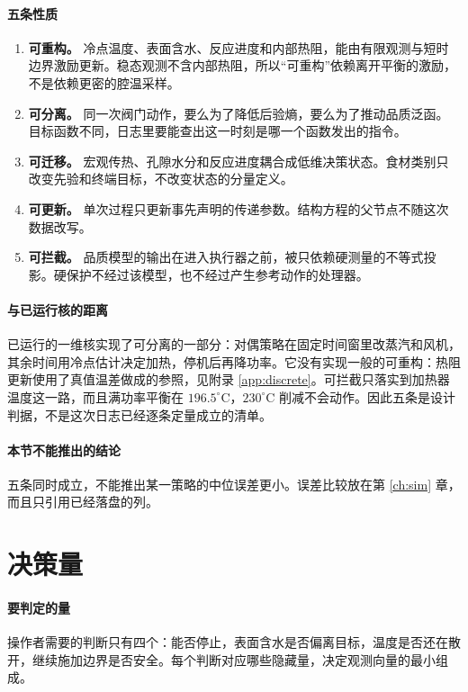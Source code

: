 \paragraph{五条性质}
\begin{enumerate}
\item \textbf{可重构。} 冷点温度、表面含水、反应进度和内部热阻，能由有限观测与短时边界激励更新。稳态观测不含内部热阻，所以“可重构”依赖离开平衡的激励，不是依赖更密的腔温采样。
\item \textbf{可分离。} 同一次阀门动作，要么为了降低后验熵，要么为了推动品质泛函。目标函数不同，日志里要能查出这一时刻是哪一个函数发出的指令。
\item \textbf{可迁移。} 宏观传热、孔隙水分和反应进度耦合成低维决策状态。食材类别只改变先验和终端目标，不改变状态的分量定义。
\item \textbf{可更新。} 单次过程只更新事先声明的传递参数。结构方程的父节点不随这次数据改写。
\item \textbf{可拦截。} 品质模型的输出在进入执行器之前，被只依赖硬测量的不等式投影。硬保护不经过该模型，也不经过产生参考动作的处理器。
\end{enumerate}

\paragraph{与已运行核的距离}
已运行的一维核实现了可分离的一部分：对偶策略在固定时间窗里改蒸汽和风机，其余时间用冷点估计决定加热，停机后再降功率。它没有实现一般的可重构：热阻更新使用了真值温差做成的参照，见附录 \ref{app:discrete}。可拦截只落实到加热器温度这一路，而且满功率平衡在 \(196.5^\circ\mathrm{C}\)，\(230^\circ\mathrm{C}\) 削减不会动作。因此五条是设计判据，不是这次日志已经逐条定量成立的清单。

\paragraph{本节不能推出的结论}
五条同时成立，不能推出某一策略的中位误差更小。误差比较放在第 \ref{ch:sim} 章，而且只引用已经落盘的列。

\section{决策量}

\paragraph{要判定的量}
操作者需要的判断只有四个：能否停止，表面含水是否偏离目标，温度是否还在散开，继续施加边界是否安全。每个判断对应哪些隐藏量，决定观测向量的最小组成。

